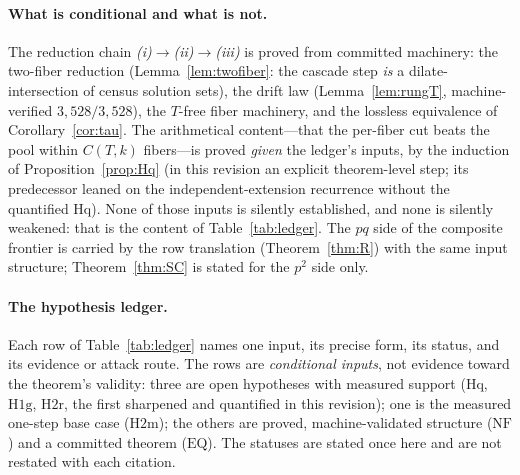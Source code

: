 \paragraph{What is conditional and what is not.}
The reduction chain \emph{(i)}$\to$\emph{(ii)}$\to$\emph{(iii)} is
proved from committed machinery: the two-fiber reduction
(Lemma~\ref{lem:twofiber}: the cascade step \emph{is} a
dilate-intersection of census solution sets), the drift law
(Lemma~\ref{lem:rungT}, machine-verified $3{,}528/3{,}528$), the
$T$-free fiber machinery, and the lossless equivalence of
Corollary~\ref{cor:tau}. The arithmetical content---that the per-fiber
cut beats the pool within $C(T,k)$ fibers---is proved \emph{given} the
ledger's inputs, by the induction of Proposition~\ref{prop:Hq} (in
this revision an explicit theorem-level step; its predecessor leaned
on the independent-extension recurrence without the quantified Hq). None of those inputs is silently established, and none
is silently weakened: that is the content of Table~\ref{tab:ledger}. The
$pq$ side of the composite frontier is carried by the row translation
(Theorem~\ref{thm:R}) with the same input structure; Theorem~\ref{thm:SC}
is stated for the $p^2$ side only.

\paragraph{The hypothesis ledger.}
Each row of Table~\ref{tab:ledger} names one input, its precise form,
its status, and its evidence or attack route. The rows are
\emph{conditional inputs}, not evidence toward the theorem's validity:
three are open hypotheses with measured support ($\mathrm{Hq}$,
$\mathrm{H1g}$, $\mathrm{H2r}$, the first sharpened and quantified in
this revision); one is the measured one-step base case
($\mathrm{H2m}$); the others are proved, machine-validated structure
($\mathrm{NF}$) and a committed theorem ($\mathrm{EQ}$). The statuses
are stated once here and are not restated with each citation.

